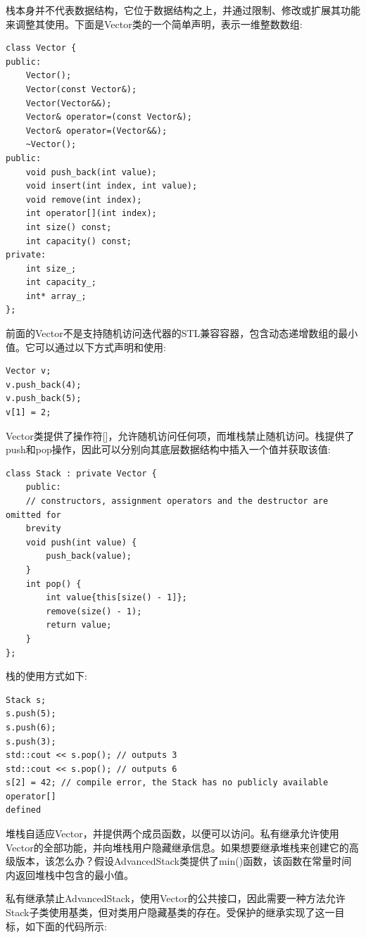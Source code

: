 栈本身并不代表数据结构，它位于数据结构之上，并通过限制、修改或扩展其功能来调整其使用。下面是Vector类的一个简单声明，表示一维整数数组:\par

\begin{lstlisting}[caption={}]
class Vector {
public:
	Vector();
	Vector(const Vector&);
	Vector(Vector&&);
	Vector& operator=(const Vector&);
	Vector& operator=(Vector&&);
	~Vector();
public:
	void push_back(int value);
	void insert(int index, int value);
	void remove(int index);
	int operator[](int index);
	int size() const;
	int capacity() const;
private:
	int size_;
	int capacity_;
	int* array_;
};
\end{lstlisting}

前面的Vector不是支持随机访问迭代器的STL兼容容器，包含动态递增数组的最小值。它可以通过以下方式声明和使用:\par

\begin{lstlisting}[caption={}]
Vector v;
v.push_back(4);
v.push_back(5);
v[1] = 2;
\end{lstlisting}

Vector类提供了操作符[]，允许随机访问任何项，而堆栈禁止随机访问。栈提供了push和pop操作，因此可以分别向其底层数据结构中插入一个值并获取该值:\par

\begin{lstlisting}[caption={}]
class Stack : private Vector {
	public:
	// constructors, assignment operators and the destructor are omitted for
	brevity
	void push(int value) {
		push_back(value);
	}
	int pop() {
		int value{this[size() - 1]};
		remove(size() - 1);
		return value;
	}
};
\end{lstlisting}

栈的使用方式如下: \par

\begin{lstlisting}[caption={}]
Stack s;
s.push(5);
s.push(6);
s.push(3);
std::cout << s.pop(); // outputs 3
std::cout << s.pop(); // outputs 6
s[2] = 42; // compile error, the Stack has no publicly available operator[]
defined
\end{lstlisting}

堆栈自适应Vector，并提供两个成员函数，以便可以访问。私有继承允许使用Vector的全部功能，并向堆栈用户隐藏继承信息。如果想要继承堆栈来创建它的高级版本，该怎么办？假设AdvancedStack类提供了min()函数，该函数在常量时间内返回堆栈中包含的最小值。\par
私有继承禁止AdvancedStack，使用Vector的公共接口，因此需要一种方法允许Stack子类使用基类，但对类用户隐藏基类的存在。受保护的继承实现了这一目标，如下面的代码所示: \par

